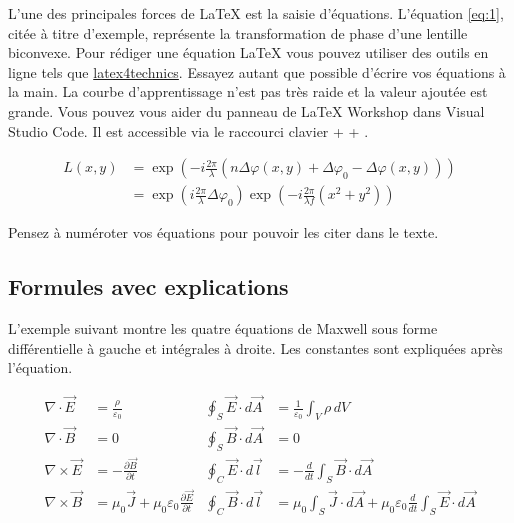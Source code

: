 L'une des principales forces de \LaTeX{} est la saisie d'équations. L'équation \ref{eq:1}, citée à titre d'exemple, représente la transformation de phase d'une lentille biconvexe. Pour rédiger une équation \LaTeX{} vous pouvez utiliser des outils en ligne tels que \href{https://www.latex4technics.com/}{latex4technics}. Essayez autant que possible d'écrire vos équations à la main.
La courbe d'apprentissage n'est pas très raide et la valeur ajoutée est grande. Vous pouvez vous aider du panneau de \LaTeX{} Workshop dans Visual Studio Code. Il est accessible via le raccourci clavier  +  + .

\begin{equation} \label{eq:1}
    \begin{split}
        L(x,y) & = \exp\left( - i\frac{{2\pi }}{\lambda }\left( {n\Delta \varphi (x,y) + \Delta {\varphi _0} - \Delta \varphi (x,y)} \right)\right)     \\
               & = {\exp\left({i\frac{{2\pi }}{\lambda }\Delta {\varphi _0}}\right)}{\exp\left({ - i\frac{{2\pi }}{{\lambda f}}({x^2} + {y^2})}\right)}
    \end{split}
\end{equation}

Pensez à numéroter vos équations pour pouvoir les citer dans le texte.

\subsection{Formules avec explications}

L'exemple suivant montre les quatre équations de Maxwell sous forme différentielle à gauche et intégrales à droite. Les constantes sont expliquées après l'équation.

\begin{subequations}
    \begin{align}
        \nabla \cdot \vec{E}  & = \frac{\rho}{\varepsilon_0}                                              & \oint_{S} \vec{E} \cdot d\vec{A} & = \frac{1}{\varepsilon_0} \int_{V} \rho \, dV                                                              \\[1em]
        \nabla \cdot \vec{B}  & = 0                                                                       & \oint_{S} \vec{B} \cdot d\vec{A} & = 0                                                                                                        \\[1em]
        \nabla \times \vec{E} & = -\frac{\partial \vec{B}}{\partial t}                                    & \oint_{C} \vec{E} \cdot d\vec{l} & = -\frac{d}{dt} \int_{S} \vec{B} \cdot d\vec{A}                                                            \\[1em]
        \nabla \times \vec{B} & = \mu_0 \vec{J} + \mu_0 \varepsilon_0 \frac{\partial \vec{E}}{\partial t} & \oint_{C} \vec{B} \cdot d\vec{l} & = \mu_0 \int_{S} \vec{J} \cdot d\vec{A} + \mu_0 \varepsilon_0 \frac{d}{dt} \int_{S} \vec{E} \cdot d\vec{A}
    \end{align}
\end{subequations}

